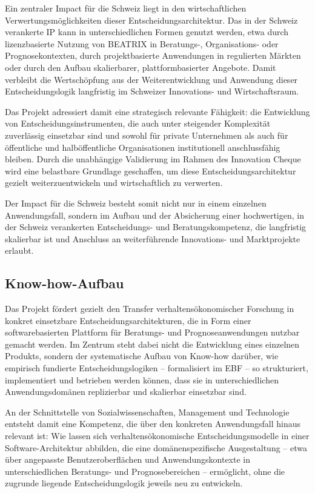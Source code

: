 \documentclass[11pt,a4paper]{article}
\begin{document}
Ein zentraler Impact für die Schweiz liegt in den wirtschaftlichen Verwertungsmöglichkeiten dieser Entscheidungsarchitektur. Das in der Schweiz verankerte IP kann in unterschiedlichen Formen genutzt werden, etwa durch lizenzbasierte Nutzung von BEATRIX in Beratungs-, Organisations- oder Prognosekontexten, durch projektbasierte Anwendungen in regulierten Märkten oder durch den Aufbau skalierbarer, plattformbasierter Angebote. Damit verbleibt die Wertschöpfung aus der Weiterentwicklung und Anwendung dieser Entscheidungslogik langfristig im Schweizer Innovations- und Wirtschaftsraum.

Das Projekt adressiert damit eine strategisch relevante Fähigkeit: die Entwicklung von Entscheidungsinstrumenten, die auch unter steigender Komplexität zuverlässig einsetzbar sind und sowohl für private Unternehmen als auch für öffentliche und halböffentliche Organisationen institutionell anschlussfähig bleiben. Durch die unabhängige Validierung im Rahmen des Innovation Cheque wird eine belastbare Grundlage geschaffen, um diese Entscheidungsarchitektur gezielt weiterzuentwickeln und wirtschaftlich zu verwerten.

Der Impact für die Schweiz besteht somit nicht nur in einem einzelnen Anwendungsfall, sondern im Aufbau und der Absicherung einer hochwertigen, in der Schweiz verankerten Entscheidungs- und Beratungskompetenz, die langfristig skalierbar ist und Anschluss an weiterführende Innovations- und Marktprojekte erlaubt.

\subsection{Know-how-Aufbau}

Das Projekt fördert gezielt den Transfer verhaltensökonomischer Forschung in konkret einsetzbare Entscheidungsarchitekturen, die in Form einer softwarebasierten Plattform für Beratungs- und Prognoseanwendungen nutzbar gemacht werden. Im Zentrum steht dabei nicht die Entwicklung eines einzelnen Produkts, sondern der systematische Aufbau von Know-how darüber, wie empirisch fundierte Entscheidungslogiken -- formalisiert im EBF -- so strukturiert, implementiert und betrieben werden können, dass sie in unterschiedlichen Anwendungsdomänen replizierbar und skalierbar einsetzbar sind.

An der Schnittstelle von Sozialwissenschaften, Management und Technologie entsteht damit eine Kompetenz, die über den konkreten Anwendungsfall hinaus relevant ist: Wie lassen sich verhaltensökonomische Entscheidungsmodelle in einer Software-Architektur abbilden, die eine domänenspezifische Ausgestaltung -- etwa über angepasste Benutzeroberflächen und Anwendungskontexte in unterschiedlichen Beratungs- und Prognosebereichen -- ermöglicht, ohne die zugrunde liegende Entscheidungslogik jeweils neu zu entwickeln.
\end{document}
